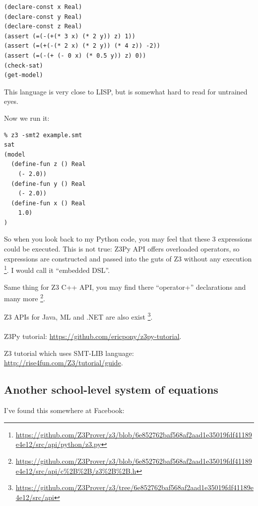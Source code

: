 \begin{lstlisting}
(declare-const x Real)
(declare-const y Real)
(declare-const z Real)
(assert (=(-(+(* 3 x) (* 2 y)) z) 1))
(assert (=(+(-(* 2 x) (* 2 y)) (* 4 z)) -2))
(assert (=(-(+ (- 0 x) (* 0.5 y)) z) 0))
(check-sat)
(get-model)
\end{lstlisting}

This language is very close to LISP, but is somewhat hard to read for untrained eyes.

Now we run it:

\begin{lstlisting}
% z3 -smt2 example.smt
sat
(model
  (define-fun z () Real
    (- 2.0))
  (define-fun y () Real
    (- 2.0))
  (define-fun x () Real
    1.0)
)
\end{lstlisting}

So when you look back to my Python code, you may feel that these 3 expressions could be executed.
This is not true: Z3Py API offers overloaded operators, so expressions are constructed and passed into the guts of Z3 without any execution
\footnote{\url{https://github.com/Z3Prover/z3/blob/6e852762baf568af2aad1e35019fdf41189e4e12/src/api/python/z3.py}}.
I would call it ``embedded \ac{DSL}''.

Same thing for Z3 C++ API, you may find there ``operator+'' declarations and many more
\footnote{\url{https://github.com/Z3Prover/z3/blob/6e852762baf568af2aad1e35019fdf41189e4e12/src/api/c\%2B\%2B/z3\%2B\%2B.h}}.

Z3 \ac{API}s for Java, ML and .NET are also exist
\footnote{\url{https://github.com/Z3Prover/z3/tree/6e852762baf568af2aad1e35019fdf41189e4e12/src/api}}.\\
\\
Z3Py tutorial: \url{https://github.com/ericpony/z3py-tutorial}.

Z3 tutorial which uses SMT-LIB language: \url{http://rise4fun.com/Z3/tutorial/guide}.

\subsection{Another school-level system of equations}
\label{eq2_SMT}

I've found this somewhere at Facebook:

